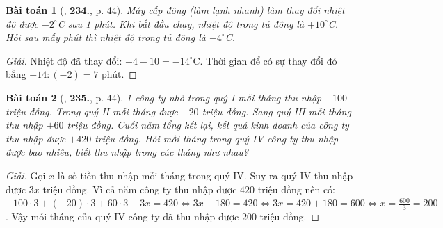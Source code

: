 \documentclass{article}
\numberwithin{equation}{section}
\newtheorem{baitoan}{Bài toán}
\begin{document}
\begin{baitoan}[\cite{Tuyen_Toan_6}, \textbf{234.}, p. 44]
	Máy cấp đông (làm lạnh nhanh) làm thay đổi nhiệt độ được $-2^\circ$C sau 1 phút. Khi bắt đầu chạy, nhiệt độ trong tủ đông là $+10^\circ$C. Hỏi sau mấy phút thì nhiệt độ trong tủ đông là $-4^\circ$C.
\end{baitoan}

\begin{proof}[Giải]
	Nhiệt độ đã thay đổi: $-4 - 10 = -14^\circ$C. Thời gian để có sự thay đổi đó bằng $-14:(-2) = 7$ phút.
\end{proof}

\begin{baitoan}[\cite{Tuyen_Toan_6}, \textbf{235.}, p. 44]
	1 công ty nhỏ trong quý I mỗi tháng thu nhập $-100$ triệu đồng. Trong quý II mỗi tháng được $-20$ triệu đồng. Sang quý III mỗi tháng thu nhập $+60$ triệu đồng. Cuối năm tổng kết lại, kết quả kinh doanh của công ty thu nhập được $+420$ triệu đồng. Hỏi mỗi tháng trong quý IV công ty thu nhập được bao nhiêu, biết thu nhập trong các tháng như nhau?
\end{baitoan}

\begin{proof}[Giải]
	Gọi $x$ là số tiền thu nhập mỗi tháng trong quý IV. Suy ra quý IV thu nhập được $3x$ triệu đồng. Vì cả năm công ty thu nhập được $420$ triệu đồng nên có: $-100\cdot3 + (-20)\cdot3 + 60\cdot3 + 3x = 420\Leftrightarrow3x - 180 = 420\Leftrightarrow3x = 420 + 180 = 600\Leftrightarrow x = \frac{600}{3} = 200$. Vậy mỗi tháng của quý IV công ty đã thu nhập được $200$ triệu đồng.
\end{proof}


\printbibliography[heading=bibintoc]
	
\end{document}
